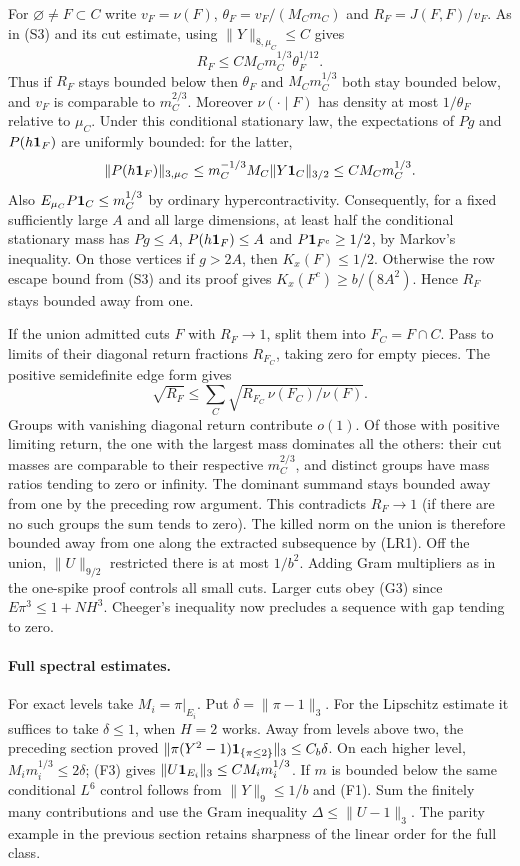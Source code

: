 For $\varnothing\ne F\subset C$ write $v_F=\nu(F)$,
$\theta_F=v_F/(M_Cm_C)$ and $R_F=J(F,F)/v_F$. As in (S3) and its
cut estimate, using $\|Y\|_{8,\mu_C}\le C$ gives
\[
 R_F\le C M_C m_C^{1/3}\theta_F^{1/12}.
\]
Thus if $R_F$ stays bounded below then $\theta_F$ and
$M_Cm_C^{1/3}$ both stay bounded below, and
$v_F$ is comparable to $m_C^{2/3}$. Moreover $\nu(\cdot\mid F)$
has density at most $1/\theta_F$ relative to $\mu_C$.
Under this conditional stationary law, the expectations of $Pg$ and
$P(h{\bf1}_F)$ are uniformly bounded: for the latter,
\[
 \|P(h{\bf1}_F)\|_{3,\mu_C}
 \le m_C^{-1/3} M_C\|Y{\bf1}_C\|_{3/2}
 \le C M_C m_C^{1/3}.
\]
Also $E_{\mu_C}P{\bf1}_C\le m_C^{1/3}$ by ordinary hypercontractivity.
Consequently, for a fixed sufficiently large $A$ and all large
dimensions, at least half the conditional stationary mass has
$Pg\le A$, $P(h{\bf1}_F)\le A$ and $P{\bf1}_{F^c}\ge1/2$, by Markov's
inequality. On those vertices if $g>2A$, then $K_x(F)\le1/2$.
Otherwise the row escape bound from (S3) and its proof gives
$K_x(F^c)\ge b/(8A^2)$. Hence $R_F$ stays bounded away from one.

If the union admitted cuts $F$ with $R_F\to1$, split them into
$F_C=F\cap C$. Pass to limits of their diagonal return fractions
$R_{F_C}$, taking zero for empty pieces. The positive semidefinite
edge form gives
\[
 \sqrt{R_F}\le \sum_C \sqrt{R_{F_C}\,\nu(F_C)/\nu(F)}.
\]
Groups with vanishing diagonal return contribute $o(1)$. Of those with
positive limiting return, the one with the largest mass dominates
all the others: their cut masses are comparable to their respective
$m_C^{2/3}$, and distinct groups have mass ratios tending to zero or
infinity. The dominant summand stays bounded away from one by the
preceding row argument. This contradicts $R_F\to1$ (if there are no
such groups the sum tends to zero). The killed norm on the union is
therefore bounded away from one along the extracted subsequence by (LR1).
Off the union, $\|U\|_{9/2}$ restricted there is at most $1/b^2$.
Adding Gram multipliers as in the one-spike proof controls all small
cuts. Larger cuts obey (G3) since $E\pi^3\le1+NH^3$. Cheeger's
inequality now precludes a sequence with gap tending to zero.

\paragraph{Full spectral estimates.}
For exact levels take $M_i=\pi|_{E_i}$. Put $\delta=\|\pi-1\|_3$.
For the Lipschitz estimate it suffices to take $\delta\le1$, when
$H=2$ works. Away from levels above two, the preceding section proved
$\|\pi(Y^2-1){\bf1}_{\{\pi\le2\}}\|_3\le C_b\delta$.
On each higher level, $M_i m_i^{1/3}\le2\delta$; (F3) gives
$\|U{\bf1}_{E_i}\|_3\le C M_i m_i^{1/3}$. If $m$ is bounded below
the same conditional $L^6$ control follows from $\|Y\|_9\le1/b$
and (F1). Sum the finitely many contributions and use the Gram
inequality $\Delta\le\|U-1\|_3$. The parity example in the previous
section retains sharpness of the linear order for the full class.

